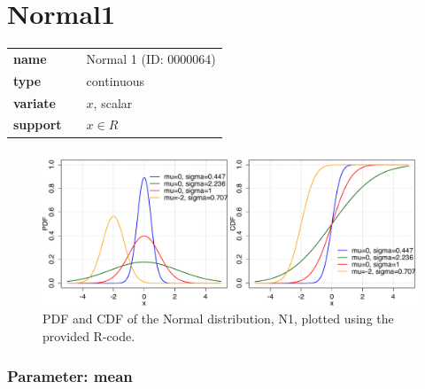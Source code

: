 %
\smallskip\section*{Normal1} 
\label{sec:appendixANormal1}

  \bigskip 

\begin{tabular}{p{2cm}cl}
\textbf{name} & & Normal 1 (ID: 0000064)\\ 
 
\textbf{type} & & continuous \\ 

\textbf{variate} & & $x$, scalar \\ 

\textbf{support} & & $x \in R$
\end{tabular}
\begin{figure}[htb!]
\centering
  \includegraphics[width=140mm]{pics/Normal1_pdf_cdf.pdf}
 \caption{PDF and CDF of the Normal distribution, N1,
 plotted using the provided R-code.}
 \label{fig:N1pdfcdf}
\end{figure}
\subsubsection*{Parameter: mean}

